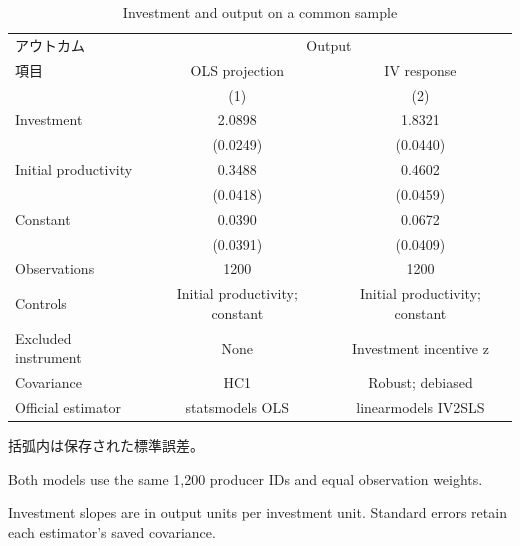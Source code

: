 \begingroup
\begin{table}[htbp]
\centering
\renewcommand{\thetable}{1}
\caption{Investment and output on a common sample}
\label{tab:common-ols-iv}
\begin{tabular}{lcc}
\toprule
アウトカム & \multicolumn{2}{c}{Output} \\
項目 & OLS projection & IV response \\
 & (1) & (2) \\
\midrule
Investment & 2.0898 & 1.8321 \\
 & (0.0249) & (0.0440) \\
Initial productivity & 0.3488 & 0.4602 \\
 & (0.0418) & (0.0459) \\
Constant & 0.0390 & 0.0672 \\
 & (0.0391) & (0.0409) \\
\midrule
Observations & 1200 & 1200 \\
Controls & Initial productivity; constant & Initial productivity; constant \\
Excluded instrument & None & Investment incentive z \\
Covariance & HC1 & Robust; debiased \\
Official estimator & statsmodels OLS & linearmodels IV2SLS \\
\bottomrule
\end{tabular}
\par\medskip\begin{minipage}{\linewidth}\footnotesize
括弧内は保存された標準誤差。\par Both models use the same 1,200 producer IDs and equal observation weights.\par Investment slopes are in output units per investment unit. Standard errors retain each estimator's saved covariance.
\end{minipage}
\end{table}
\endgroup
